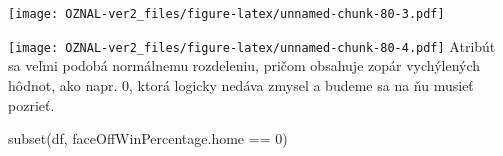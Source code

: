 \documentclass[
]{article}
\newenvironment{Shaded}{\begin{snugshade}}{\end{snugshade}}
\newcommand{\AttributeTok}[1]{\textcolor[rgb]{0.77,0.63,0.00}{#1}}
\newcommand{\DecValTok}[1]{\textcolor[rgb]{0.00,0.00,0.81}{#1}}
\newcommand{\FunctionTok}[1]{\textcolor[rgb]{0.00,0.00,0.00}{#1}}
\newcommand{\NormalTok}[1]{#1}
\newcommand{\SpecialCharTok}[1]{\textcolor[rgb]{0.00,0.00,0.00}{#1}}
\newcommand{\StringTok}[1]{\textcolor[rgb]{0.31,0.60,0.02}{#1}}
\begin{document}
\texttt{[image: OZNAL-ver2\_files/figure-latex/unnamed-chunk-80-3.pdf]}

\begin{Shaded}
\end{Shaded}

\texttt{[image: OZNAL-ver2\_files/figure-latex/unnamed-chunk-80-4.pdf]}
Atribút sa veľmi podobá normálnemu rozdeleniu, pričom obsahuje zopár
vychýlených hôdnot, ako napr. 0, ktorá logicky nedáva zmysel a budeme sa
na ňu musieť pozrieť.

\begin{Shaded}
\begin{Highlighting}[]
\FunctionTok{subset}\NormalTok{(df, faceOffWinPercentage.home }\SpecialCharTok{==} \DecValTok{0}\NormalTok{)}
\end{Highlighting}
\end{Shaded}
\end{document}

